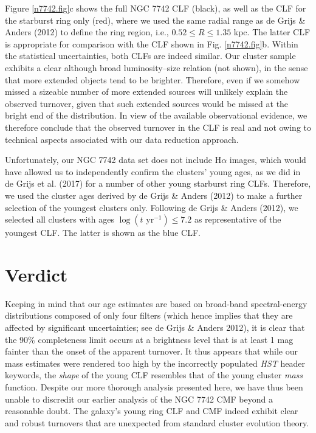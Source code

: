 \documentclass{raa}            %
\begin{document}
Figure \ref{n7742.fig}c shows the full NGC 7742 CLF (black), as well
as the CLF for the starburst ring only (red), where we used the same
radial range as de Grijs \& Anders (2012) to define the ring region,
i.e., $0.52 \le R \le 1.35$ kpc. The latter CLF is appropriate for
comparison with the CLF shown in Fig. \ref{n7742.fig}b. Within the
statistical uncertainties, both CLFs are indeed similar. Our cluster
sample exhibits a clear although broad luminosity--size relation (not
shown), in the sense that more extended objects tend to be
brighter. Therefore, even if we somehow missed a sizeable number of
more extended sources will unlikely explain the observed turnover,
given that such extended sources would be missed at the bright end of
the distribution. In view of the available observational evidence, we
therefore conclude that the observed turnover in the CLF is real and
not owing to technical aspects associated with our data reduction
approach.

Unfortunately, our NGC 7742 data set does not include H$\alpha$
images, which would have allowed us to independently confirm the
clusters' young ages, as we did in de Grijs et al. (2017) for a number
of other young starburst ring CLFs. Therefore, we used the cluster
ages derived by de Grijs \& Anders (2012) to make a further selection
of the youngest clusters only. Following de Grijs \& Anders (2012), we
selected all clusters with ages $\log( t \mbox{ yr}^{-1}) \le 7.2$ as
representative of the youngest CLF. The latter is shown as the blue
CLF.

\section{Verdict}

Keeping in mind that our age estimates are based on broad-band
spectral-energy distributions composed of only four filters (which
hence implies that they are affected by significant uncertainties; see
de Grijs \& Anders 2012), it is clear that the 90\% completeness limit
occurs at a brightness level that is at least 1 mag fainter than the
onset of the apparent turnover. It thus appears that while our mass
estimates were rendered too high by the incorrectly populated {\sl
  HST} header keywords, the {\it shape} of the young CLF resembles
that of the young cluster {\it mass} function. Despite our more
thorough analysis presented here, we have thus been unable to
discredit our earlier analysis of the NGC 7742 CMF beyond a reasonable
doubt. The galaxy's young ring CLF and CMF indeed exhibit clear and
robust turnovers that are unexpected from standard cluster evolution
theory. 
\end{document}
